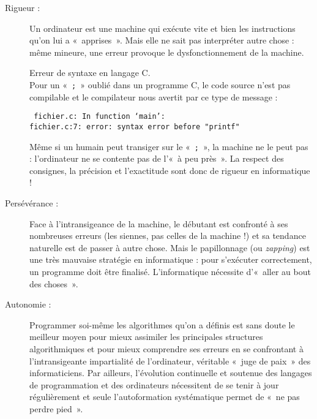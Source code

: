 \begin{description}
\item[Rigueur :] Un ordinateur est une machine qui exécute vite et bien les
	instructions qu'on lui a «~apprises~». Mais elle ne sait pas interpréter
	autre chose : même mineure, une erreur provoque le dysfonctionnement de la 
	machine.
	\begin{ex}Erreur de syntaxe en langage C.\\
	Pour un «~{\tt ;}~» oublié dans un programme {\sc C}, le code source n'est pas compilable
	et le compilateur nous avertit par ce type de message :\\
	
	\noindent\mbox{}\hspace*{1cm}\begin{minipage}[t]{12cm}\tt
	fichier.c: In function `main':\\
	fichier.c:7: error: syntax error before "printf"
	\end{minipage}
	\end{ex}
	Même si un humain peut transiger sur le «~{\tt ;}~», la machine ne le peut pas : 
	l'ordinateur ne se contente pas de l'«~à peu près~».
	La respect des consignes, la précision et l'exactitude sont donc de 
	rigueur en informatique !
\item[Persévérance :] \mbox{}	
	Face à l'intransigeance de la machine, le débutant est confronté
	à ses nombreuses erreurs (les siennes, pas celles de la machine !) et sa tendance
	naturelle est de passer à autre chose. 
	Mais le papillonnage (ou {\em zapping})
	est une très mauvaise stratégie en informatique : pour s'exécuter correctement,
	un programme doit être finalisé. L'informatique nécessite d'«~aller au bout des
	choses~».
\item[Autonomie :] Programmer soi-même les algorithmes
	qu'on a définis est sans doute le meilleur moyen pour mieux assimiler
	les principales structures algorithmiques et pour mieux comprendre ses
	erreurs en se confrontant à l'intransigeante impartialité de l'ordinateur,
	vérita\-ble «~juge de paix~» des informaticiens.
	Par ailleurs, l'évolution continuelle et soutenue des langages de programmation et des 
	ordinateurs nécessitent de se tenir à jour régulièrement et seule l'autoformation systématique 
	permet de «~ne pas perdre pied~».
	

\end{description}
